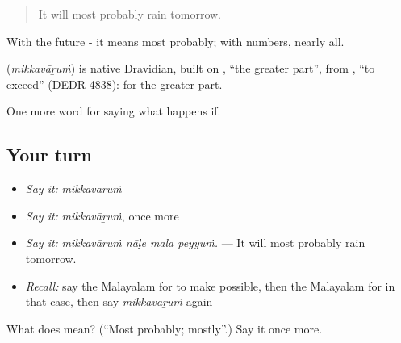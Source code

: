 \begin{quote}
It will most probably rain tomorrow.
\end{quote}

With the future - it means most probably; with numbers, nearly all.

\begin{cousinweb}
\textbf{} (\emph{mikkavāṟuṁ}) is native Dravidian, built on , \textquotedblleft{}the greater part\textquotedblright{}, from , \textquotedblleft{}to exceed\textquotedblright{} (DEDR 4838): for the greater part.
\end{cousinweb}

\begin{grammarlens}[title={What you've built}]
One more word for saying what happens if.
\end{grammarlens}

\subsection*{Your turn}
\begin{itemize}
\raggedright
  \item \emph{Say it:} \emph{mikkavāṟuṁ}
  \item \emph{Say it:} \emph{mikkavāṟuṁ}, once more
  \item \emph{Say it:} \emph{mikkavāṟuṁ nāḷe maḻa peyyuṁ.} — It will most probably rain tomorrow.
  \item \emph{Recall:} say the Malayalam for to make possible, then the Malayalam for in that case, then say \emph{mikkavāṟuṁ} again
\end{itemize}

\begin{tcolorbox}[breakable,colback=teal!4,colframe=teal!35!black,title={Before you move on}]
What does  mean? (\textquotedblleft{}Most probably; mostly\textquotedblright{}.) Say it once more.
\end{tcolorbox}
